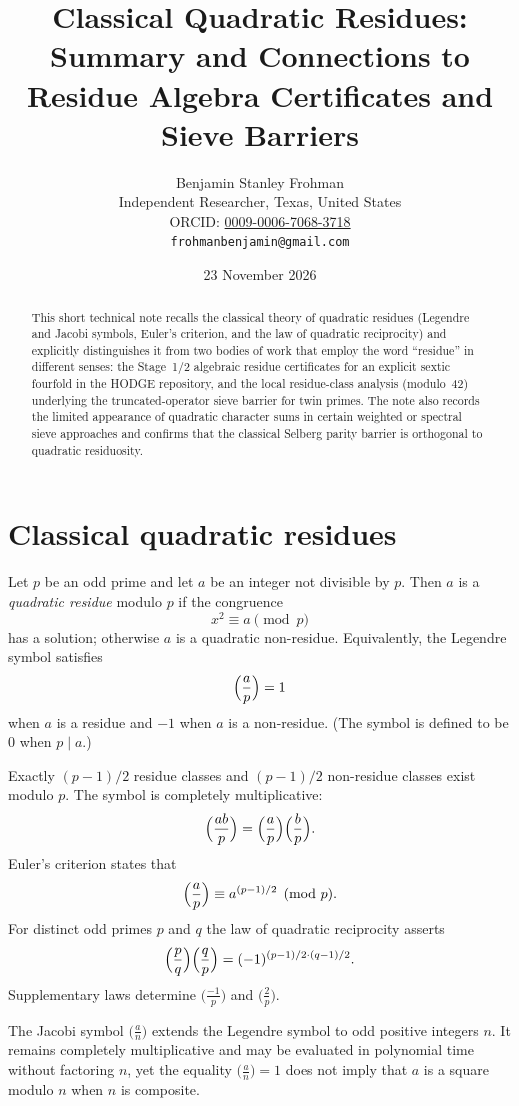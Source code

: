 \documentclass[11pt,a4paper]{article}
\title{\textbf{Classical Quadratic Residues:\\Summary and Connections to Residue Algebra Certificates and Sieve Barriers}}
\author{Benjamin Stanley Frohman\\
Independent Researcher, Texas, United States\\
ORCID: \href{https://orcid.org/0009-0006-7068-3718}{0009-0006-7068-3718}\\
\texttt{frohmanbenjamin@gmail.com}}
\date{23 November 2026}
\begin{document}
\maketitle

\begin{abstract}
This short technical note recalls the classical theory of quadratic residues (Legendre and Jacobi symbols, Euler’s criterion, and the law of quadratic reciprocity) and explicitly distinguishes it from two bodies of work that employ the word ``residue'' in different senses: the Stage~1/2 algebraic residue certificates for an explicit sextic fourfold in the HODGE repository, and the local residue-class analysis (modulo~42) underlying the truncated-operator sieve barrier for twin primes. The note also records the limited appearance of quadratic character sums in certain weighted or spectral sieve approaches and confirms that the classical Selberg parity barrier is orthogonal to quadratic residuosity.
\end{abstract}

\section{Classical quadratic residues}

Let \(p\) be an odd prime and let \(a\) be an integer not divisible by \(p\). Then \(a\) is a \emph{quadratic residue} modulo \(p\) if the congruence
\[
x^2 \equiv a \pmod{p}
\]
has a solution; otherwise \(a\) is a quadratic non-residue. Equivalently, the Legendre symbol satisfies
\[
\Bigl(\frac{a}{p}\Bigr) = 1
\]
when \(a\) is a residue and \(-1\) when \(a\) is a non-residue. (The symbol is defined to be \(0\) when \(p\mid a\).)

Exactly \((p-1)/2\) residue classes and \((p-1)/2\) non-residue classes exist modulo \(p\). The symbol is completely multiplicative:
\[
\Bigl(\frac{ab}{p}\Bigr) = \Bigl(\frac{a}{p}\Bigr)\Bigl(\frac{b}{p}\Bigr).
\]
Euler’s criterion states that
\[
\Bigl(\frac{a}{p}\Bigr) \equiv a^{(p-1)/2} \pmod{p}.
\]
For distinct odd primes \(p\) and \(q\) the law of quadratic reciprocity asserts
\[
\Bigl(\frac{p}{q}\Bigr)\Bigl(\frac{q}{p}\Bigr) = (-1)^{(p-1)/2\cdot(q-1)/2}.
\]
Supplementary laws determine \(\bigl(\frac{-1}{p}\bigr)\) and \(\bigl(\frac{2}{p}\bigr)\).

The Jacobi symbol \(\bigl(\frac{a}{n}\bigr)\) extends the Legendre symbol to odd positive integers \(n\). It remains completely multiplicative and may be evaluated in polynomial time without factoring \(n\), yet the equality \(\bigl(\frac{a}{n}\bigr)=1\) does not imply that \(a\) is a square modulo \(n\) when \(n\) is composite.
\end{document}

